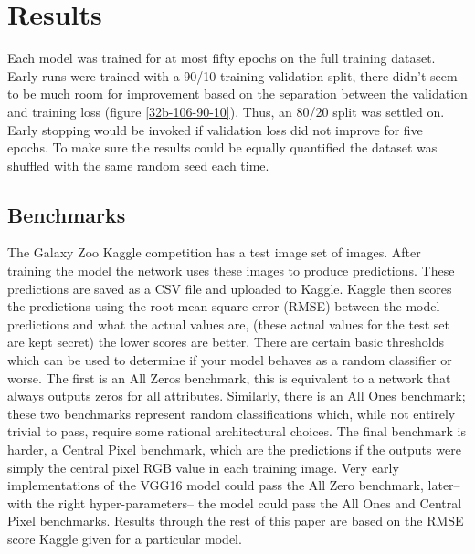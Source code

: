 \section{Results}



Each model was trained for at most fifty epochs on the full training dataset. Early runs were trained with a 90/10 training-validation split, there didn't seem to be much room for improvement based on the separation between the validation and training loss (figure \ref{32b-106-90-10}). Thus, an 80/20 split was settled on. Early stopping would be invoked if validation loss did not improve for five epochs. To make sure the results could be equally quantified the dataset was shuffled with the same random seed each time.

\subsection{Benchmarks}
The Galaxy Zoo Kaggle competition has a test image set of  images. After training the model the network uses these images to produce predictions. These predictions are saved as a CSV file and uploaded to Kaggle. Kaggle then scores the predictions using the root mean square error (RMSE) between the model predictions and what the actual values are, (these actual values for the test set are kept secret) the lower scores are better. There are certain basic thresholds which can be used to determine if your model behaves as a random classifier or worse. The first is an All Zeros benchmark, this is equivalent to a network that always outputs zeros for all attributes. Similarly, there is an All Ones benchmark; these two benchmarks represent random classifications which, while not entirely trivial to pass, require some rational architectural choices. The final benchmark is harder, a Central Pixel benchmark, which are the predictions if the outputs were simply the central pixel RGB value in each training image. Very early implementations of the VGG16 model could pass the All Zero benchmark, later--with the right hyper-parameters-- the model could pass the All Ones and Central Pixel benchmarks. Results through the rest of this paper are based on the RMSE score Kaggle given for a particular model.

